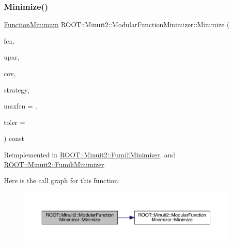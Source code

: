 \subsubsection{\texorpdfstring{Minimize()}{Minimize()}\hspace{0.1cm}{\footnotesize\ttfamily [14/22]}}
{\footnotesize\ttfamily \mbox{\hyperlink{classROOT_1_1Minuit2_1_1FunctionMinimum}{Function\+Minimum}} R\+O\+O\+T\+::\+Minuit2\+::\+Modular\+Function\+Minimizer\+::\+Minimize (\begin{DoxyParamCaption}\item[{const \mbox{\hyperlink{classROOT_1_1Minuit2_1_1FCNBase}{F\+C\+N\+Base}} \&}]{fcn,  }\item[{const \mbox{\hyperlink{classROOT_1_1Minuit2_1_1MnUserParameters}{Mn\+User\+Parameters}} \&}]{upar,  }\item[{const \mbox{\hyperlink{classROOT_1_1Minuit2_1_1MnUserCovariance}{Mn\+User\+Covariance}} \&}]{cov,  }\item[{const \mbox{\hyperlink{classROOT_1_1Minuit2_1_1MnStrategy}{Mn\+Strategy}} \&}]{strategy,  }\item[{unsigned int}]{maxfcn = {},  }\item[{double}]{toler = {} }\end{DoxyParamCaption}) const\hspace{0.3cm}{\ttfamily [virtual]}}



Reimplemented in \mbox{\hyperlink{classROOT_1_1Minuit2_1_1FumiliMinimizer_a954728eb57315bb43039fe2ba71f4098}{R\+O\+O\+T\+::\+Minuit2\+::\+Fumili\+Minimizer}}, and \mbox{\hyperlink{classROOT_1_1Minuit2_1_1FumiliMinimizer_a954728eb57315bb43039fe2ba71f4098}{R\+O\+O\+T\+::\+Minuit2\+::\+Fumili\+Minimizer}}.

Here is the call graph for this function\+:\nopagebreak
\begin{figure}[H]
\begin{center}
\leavevmode
\includegraphics[width=350pt]{d3/dc8/classROOT_1_1Minuit2_1_1ModularFunctionMinimizer_a8db208c6cdcef4c527781732ee613436_cgraph}
\end{center}
\end{figure}
\mbox{\label{classROOT_1_1Minuit2_1_1ModularFunctionMinimizer_afcfe05cabceaab80b036f5b809c6de32}} 
